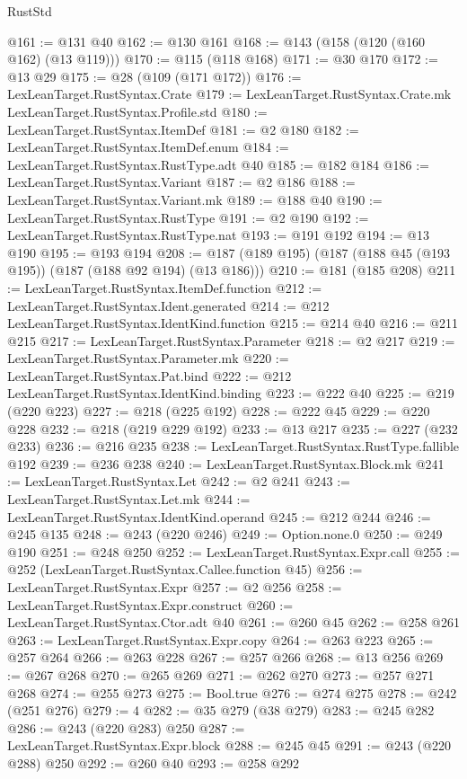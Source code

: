 \begin{lexlean}{RustStd}
\begin{coremodule}
@161 := @131 @40
@162 := @130 @161
@168 := @143 (@158 (@120 (@160 @162) (@13 @119)))
@170 := @115 (@118 @168)
@171 := @30 @170
@172 := @13 @29
@175 := @28 (@109 (@171 @172))
@176 := LexLeanTarget.RustSyntax.Crate
@179 := LexLeanTarget.RustSyntax.Crate.mk LexLeanTarget.RustSyntax.Profile.std
@180 := LexLeanTarget.RustSyntax.ItemDef
@181 := @2 @180
@182 := LexLeanTarget.RustSyntax.ItemDef.enum
@184 := LexLeanTarget.RustSyntax.RustType.adt @40
@185 := @182 @184
@186 := LexLeanTarget.RustSyntax.Variant
@187 := @2 @186
@188 := LexLeanTarget.RustSyntax.Variant.mk
@189 := @188 @40
@190 := LexLeanTarget.RustSyntax.RustType
@191 := @2 @190
@192 := LexLeanTarget.RustSyntax.RustType.nat
@193 := @191 @192
@194 := @13 @190
@195 := @193 @194
@208 := @187 (@189 @195) (@187 (@188 @45 (@193 @195)) (@187 (@188 @92 @194) (@13 @186)))
@210 := @181 (@185 @208)
@211 := LexLeanTarget.RustSyntax.ItemDef.function
@212 := LexLeanTarget.RustSyntax.Ident.generated
@214 := @212 LexLeanTarget.RustSyntax.IdentKind.function
@215 := @214 @40
@216 := @211 @215
@217 := LexLeanTarget.RustSyntax.Parameter
@218 := @2 @217
@219 := LexLeanTarget.RustSyntax.Parameter.mk
@220 := LexLeanTarget.RustSyntax.Pat.bind
@222 := @212 LexLeanTarget.RustSyntax.IdentKind.binding
@223 := @222 @40
@225 := @219 (@220 @223)
@227 := @218 (@225 @192)
@228 := @222 @45
@229 := @220 @228
@232 := @218 (@219 @229 @192)
@233 := @13 @217
@235 := @227 (@232 @233)
@236 := @216 @235
@238 := LexLeanTarget.RustSyntax.RustType.fallible @192
@239 := @236 @238
@240 := LexLeanTarget.RustSyntax.Block.mk
@241 := LexLeanTarget.RustSyntax.Let
@242 := @2 @241
@243 := LexLeanTarget.RustSyntax.Let.mk
@244 := LexLeanTarget.RustSyntax.IdentKind.operand
@245 := @212 @244
@246 := @245 @135
@248 := @243 (@220 @246)
@249 := Option.none.{0}
@250 := @249 @190
@251 := @248 @250
@252 := LexLeanTarget.RustSyntax.Expr.call
@255 := @252 (LexLeanTarget.RustSyntax.Callee.function @45)
@256 := LexLeanTarget.RustSyntax.Expr
@257 := @2 @256
@258 := LexLeanTarget.RustSyntax.Expr.construct
@260 := LexLeanTarget.RustSyntax.Ctor.adt @40
@261 := @260 @45
@262 := @258 @261
@263 := LexLeanTarget.RustSyntax.Expr.copy
@264 := @263 @223
@265 := @257 @264
@266 := @263 @228
@267 := @257 @266
@268 := @13 @256
@269 := @267 @268
@270 := @265 @269
@271 := @262 @270
@273 := @257 @271 @268
@274 := @255 @273
@275 := Bool.true
@276 := @274 @275
@278 := @242 (@251 @276)
@279 := 4
@282 := @35 @279 (@38 @279)
@283 := @245 @282
@286 := @243 (@220 @283) @250
@287 := LexLeanTarget.RustSyntax.Expr.block
@288 := @245 @45
@291 := @243 (@220 @288) @250
@292 := @260 @40
@293 := @258 @292

\end{coremodule}
\end{lexlean}
